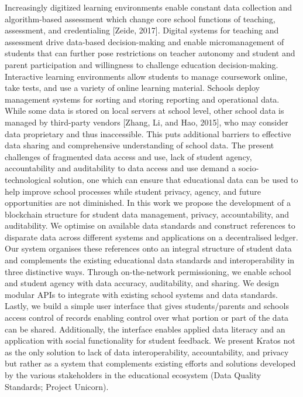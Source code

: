 \documentclass{article}
\begin{document}
\bigbreak
Increasingly digitized learning environments enable constant data collection and algorithm-based assessment which change core school functions of teaching, assessment, and credentialing [Zeide, 2017]. Digital systems for teaching and assessment drive data-based decision-making and enable micromanagement of students that can further pose restrictions on teacher autonomy and student and parent participation and willingness to challenge education decision-making. Interactive learning environments allow students to manage coursework online, take tests, and use a variety of online learning material. Schools deploy management systems for sorting and storing reporting and operational data. While some data is stored on local servers at school level, other school data is managed by third-party vendors [Zhang, Li, and Hao, 2015], who may consider data proprietary and thus inaccessible. This puts additional barriers to effective data sharing and comprehensive understanding of school data.
\bigbreak
The present challenges of fragmented data access and use, lack of student agency, accountability and auditability to data access and use demand a socio-technological solution, one which can ensure that educational data can be used to help improve school processes while student privacy, agency, and future opportunities are not diminished.
\bigbreak
In this work we propose the development of a blockchain structure for student data management, privacy, accountability, and auditability. We optimise on available data standards and construct references to disparate data across different systems and applications on a decentralised ledger. Our system organises these references onto an integral structure of student data and complements the existing educational data standards and interoperability in three distinctive ways. Through on-the-network permissioning, we enable school and student agency with data accuracy, auditability, and sharing. We design modular APIs to integrate with existing school systems and data standards. Lastly, we build a simple user interface that gives students/parents and schools access control of records enabling control over what portion or part of the data can be shared. Additionally, the interface enables applied data literacy and an application with social functionality for student feedback.
\bigbreak
We present Kratos not as the only solution to lack of data interoperability, accountability, and privacy but rather as a system that complements existing efforts and solutions developed by the various stakeholders in the educational ecosystem (Data Quality Standards; Project Unicorn).
\end{document}
